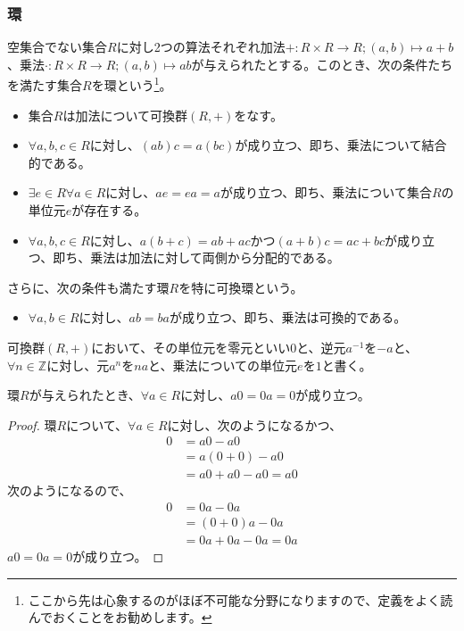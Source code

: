 \documentclass[dvipdfmx]{jsarticle}
\begin{document}
\subsubsection{環}%
\begin{axs}[環の公理]
空集合でない集合$R$に対し2つの算法それぞれ加法$+ :R \times R \rightarrow R;(a,b) \mapsto a + b$、乗法$\cdot :R \times R \rightarrow R;(a,b) \mapsto ab$が与えられたとする。このとき、次の条件たちを満たす集合$R$を環という\footnote{ここから先は心象するのがほぼ不可能な分野になりますので、定義をよく読んでおくことをお勧めします。}。
\begin{itemize}
\item
  集合$R$は加法について可換群$(R, + )$をなす。
\item
  $\forall a,b,c \in R$に対し、$(ab)c = a(bc)$が成り立つ、即ち、乗法について結合的である。
\item
  $\exists e \in R\forall a \in R$に対し、$ae = ea = a$が成り立つ、即ち、乗法について集合$R$の単位元$e$が存在する。
\item
  $\forall a,b,c \in R$に対し、$a(b + c) = ab + ac$かつ$(a + b)c = ac + bc$が成り立つ、即ち、乗法は加法に対して両側から分配的である。
\end{itemize}
さらに、次の条件も満たす環$R$を特に可換環という。
\begin{itemize}
\item
  $\forall a,b \in R$に対し、$ab = ba$が成り立つ、即ち、乗法は可換的である。
\end{itemize}
\end{axs}
\begin{dfn}
可換群$(R, + )$において、その単位元を零元といい$0$と、逆元$a^{- 1}$を$- a$と、$\forall n \in \mathbb{Z}$に対し、元$a^{n}$を$na$と、乗法についての単位元$e$を$1$と書く。
\end{dfn}
\begin{thm}\label{4.1.1.5}
環$R$が与えられたとき、$\forall a \in R$に対し、$a0 = 0a = 0$が成り立つ。
\end{thm}
\begin{proof} 環$R$について、$\forall a \in R$に対し、次のようになるかつ、
\begin{align*}
0 &= a0 - a0\\
&= a(0 + 0) - a0\\
&= a0 + a0 - a0 = a0
\end{align*}
次のようになるので、
\begin{align*}
0 &= 0a - 0a\\
&= (0 + 0)a - 0a\\
&= 0a + 0a - 0a = 0a
\end{align*}
$a0 = 0a = 0$が成り立つ。
\end{proof}
\end{document}
